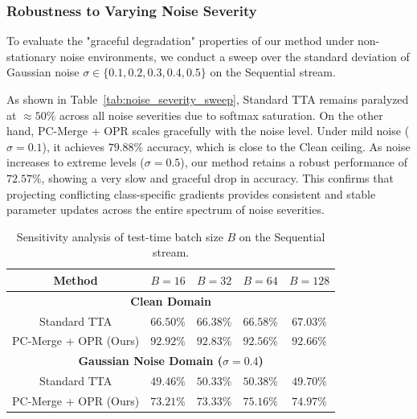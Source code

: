 \documentclass{article}
\theoremstyle{plain}
\theoremstyle{definition}
\theoremstyle{remark}
\begin{document}
\subsubsection{Robustness to Varying Noise Severity}
To evaluate the "graceful degradation" properties of our method under non-stationary noise environments, we conduct a sweep over the standard deviation of Gaussian noise $\sigma \in \{0.1, 0.2, 0.3, 0.4, 0.5\}$ on the Sequential stream.

As shown in Table~\ref{tab:noise_severity_sweep}, Standard TTA remains paralyzed at $\approx 50\%$ across all noise severities due to softmax saturation. On the other hand, PC-Merge + OPR scales gracefully with the noise level. Under mild noise ($\sigma = 0.1$), it achieves $79.88\%$ accuracy, which is close to the Clean ceiling. As noise increases to extreme levels ($\sigma = 0.5$), our method retains a robust performance of $72.57\%$, showing a very slow and graceful drop in accuracy. This confirms that projecting conflicting class-specific gradients provides consistent and stable parameter updates across the entire spectrum of noise severities.

\begin{table}[t]
\caption{Sensitivity analysis of test-time batch size $B$ on the Sequential stream.}
\label{tab:batch_sweep}
\vskip 0.1in
\begin{center}
\begin{small}
\scshape
\begin{tabular}{ccccc}
\toprule
Method & $B=16$ & $B=32$ & $B=64$ & $B=128$ \\
\midrule
\multicolumn{5}{c}{\textbf{Clean Domain}} \\
\midrule
Standard TTA & $66.50\%$ & $66.38\%$ & $66.58\%$ & $67.03\%$ \\
PC-Merge + OPR (Ours) & $92.92\%$ & $92.83\%$ & $92.56\%$ & $92.66\%$ \\
\midrule
\multicolumn{5}{c}{\textbf{Gaussian Noise Domain ($\sigma=0.4$)}} \\
\midrule
Standard TTA & $49.46\%$ & $50.33\%$ & $50.38\%$ & $49.70\%$ \\
PC-Merge + OPR (Ours) & $73.21\%$ & $73.33\%$ & $75.16\%$ & $74.97\%$ \\
\bottomrule
\end{tabular}
\end{small}
\end{center}
\vskip -0.1in
\end{table}
\end{document}

